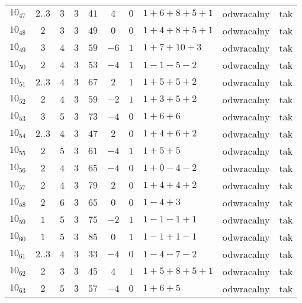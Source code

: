 \begin{longtable}{lccccccllc}
$10_{47}$   &  $2..3$  &  $3$  &  $3$      &  $41$   &  $4$   &  $0$  &  $1+6+8+5+1$    &  odwracalny  &  tak  \\
$10_{48}$   &  $2$     &  $3$  &  $3$      &  $49$   &  $0$   &  $0$  &  $1+4+8+5+1$    &  odwracalny  &  tak  \\
$10_{49}$   &  $3$     &  $4$  &  $3$      &  $59$   &  $-6$  &  $1$  &  $1+7+10+3$     &  odwracalny  &  tak  \\
$10_{50}$   &  $2$     &  $4$  &  $3$      &  $53$   &  $-4$  &  $1$  &  $1-1-5-2$      &  odwracalny  &  tak  \\
$10_{51}$   &  $2..3$  &  $4$  &  $3$      &  $67$   &  $2$   &  $1$  &  $1+5+5+2$      &  odwracalny  &  tak  \\
$10_{52}$   &  $2$     &  $4$  &  $3$      &  $59$   &  $-2$  &  $1$  &  $1+3+5+2$      &  odwracalny  &  tak  \\
$10_{53}$   &  $3$     &  $5$  &  $3$      &  $73$   &  $-4$  &  $0$  &  $1+6+6$        &  odwracalny  &  tak  \\
$10_{54}$   &  $2..3$  &  $4$  &  $3$      &  $47$   &  $2$   &  $0$  &  $1+4+6+2$      &  odwracalny  &  tak  \\
$10_{55}$   &  $2$     &  $5$  &  $3$      &  $61$   &  $-4$  &  $1$  &  $1+5+5$        &  odwracalny  &  tak  \\
$10_{56}$   &  $2$     &  $4$  &  $3$      &  $65$   &  $-4$  &  $0$  &  $1+0-4-2$      &  odwracalny  &  tak  \\
$10_{57}$   &  $2$     &  $4$  &  $3$      &  $79$   &  $2$   &  $0$  &  $1+4+4+2$      &  odwracalny  &  tak  \\
$10_{58}$   &  $2$     &  $6$  &  $3$      &  $65$   &  $0$   &  $0$  &  $1-4+3$        &  odwracalny  &  tak  \\
$10_{59}$   &  $1$     &  $5$  &  $3$      &  $75$   &  $-2$  &  $1$  &  $1-1-1+1$      &  odwracalny  &  tak  \\
$10_{60}$   &  $1$     &  $5$  &  $3$      &  $85$   &  $0$   &  $1$  &  $1-1+1-1$      &  odwracalny  &  tak  \\
$10_{61}$   &  $2..3$  &  $4$  &  $3$      &  $33$   &  $-4$  &  $0$  &  $1-4-7-2$      &  odwracalny  &  tak  \\
$10_{62}$   &  $2$     &  $3$  &  $3$      &  $45$   &  $4$   &  $1$  &  $1+5+8+5+1$    &  odwracalny  &  tak  \\
$10_{63}$   &  $2$     &  $5$  &  $3$      &  $57$   &  $-4$  &  $0$  &  $1+6+5$        &  odwracalny  &  tak  \\

\end{longtable}
